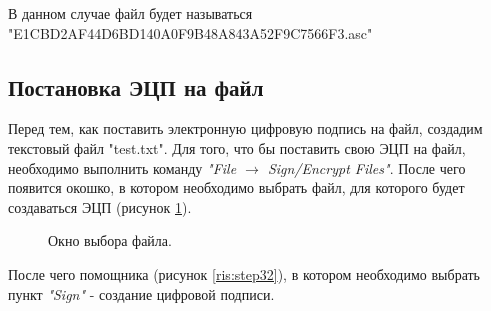 \documentclass[10pt,a4paper]{report}
\begin{document}
В данном случае файл будет называться\\"E1CBD2AF44D6BD140A0F9B48A843A52F9C7566F3.asc"

\subsection{Постановка ЭЦП на файл}
Перед тем, как поставить электронную цифровую подпись на файл, создадим текстовый файл "test.txt". Для того, что бы поставить свою ЭЦП на файл, необходимо выполнить команду \textit{"File \begin{math}\to\end{math} Sign/Encrypt Files"}. После чего появится окошко, в котором необходимо выбрать файл, для которого будет создаваться ЭЦП (рисунок \ref{ris:step31}).

\begin{figure}[h]
	\caption{Окно выбора файла.}
	\label{ris:step31}
\end{figure}

После чего помощника (рисунок \ref{ris:step32}), в котором необходимо выбрать пункт \textit{"Sign"} - создание цифровой подписи.
\end{document}
